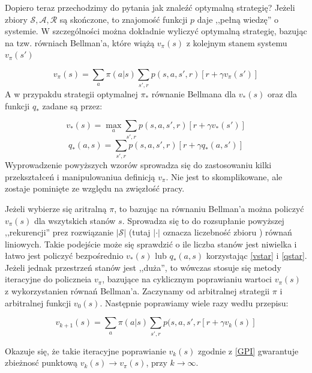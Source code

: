 \documentclass[licencjacka]{pracamgr}
\begin{document}
Dopiero teraz przechodzimy do pytania jak znaleźć optymalną strategię? Jeżeli zbiory  $\mathcal{S}, \mathcal{A}, \mathcal{R}$ są skończone, to znajomość funkcji $p$ daje ,,pełną wiedzę'' o systemie. W szczególności można dokładnie wyliczyć optymalną strategię, bazując na tzw. równiach Bellman'a, które wiążą $v_{\pi}(s)$ z kolejnym stanem systemu $v_{\pi}(s')$

\begin{equation}
	v_{\pi}(s) = \sum_{a}\pi(a|s)\sum_{s',r}p(s,a,s',r)[r +\gamma v_{\pi}(s')] 
\end{equation}
A w przypakdu strategii optymalnej $\pi_{*}$ równanie Bellmana dla $v_{*}(s)$ oraz dla funkcji $q_{*}$ zadane są przez:

\begin{equation}\label{vstar}
	v_{*}(s) = \max_{a}\sum_{s',r}p(s,a,s',r)[r +\gamma v_{*}(s')]
\end{equation}
\begin{equation}\label{qstar}
	q_{*}(a, s) = \sum_{s',r}p(s,a,s',r)[r +\gamma q_{*}(a,s')]
\end{equation}
Wyprowadzenie powyższych wzorów sprowadza się do zastosowaniu kilki przekształceń i manipulowaniua definicją $v_{\pi}$. Nie jest to skomplikowane, ale zostaje pominięte ze względu na zwięzłość pracy. 

Jeżeli wybierze się aritralną  $\pi$, to bazując na równaniu Bellman'a można policzyć $v_{\pi}(s)$ dla wszytskich stanów $s$. Sprowadza się to do rozsupłanie powyższej ,,rekurencji''  prez rozwiązanie 
$|\mathcal{S}|$  (tutaj $|\cdot|$ oznacza liczebność zbioru ) równań liniowych. Takie podejście może się sprawdzić o ile liczba stanów jest niwielka i łatwo jest policzyć bezpośrednio $v_{*}(s)$ lub $q_{*}(a,s)$ korzystając \ref{vstar} i \ref{qstar}.  Jeżeli jednak przestrzeń stanów jest ,,duża'', to  wówczas stosuje się metody iteracyjne do policzneia $v_{\pi}$, bazujące na cyklicznym poprawianiu wartoci $v_{\pi}(s)$ z wykorzystanien równań Bellman'a. Zaczynamy od arbitralnej strategii $\pi$ i arbitralnej funkcji $v_{0}(s)$. Następnie poprawiamy wiele razy wedłu przepisu:

\begin{equation}\label{GPI}
	v_{k+1}(s) = \sum_{a}\pi(a|s)\sum_{s',r}p(s,a,s',r[r+\gamma v_{k}(s)]
\end{equation}

Okazuje się, że takie iteracyjne poprawianie $v_{k}(s)$ zgodnie z \ref{GPI} gwarantuje zbieżnosć punktową $v_{k}(s)\rightarrow v_{\pi}(s)$, przy $k\rightarrow\infty$.\\
\end{document}
